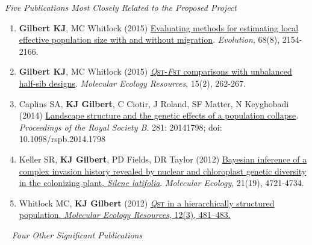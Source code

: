 \emph{Five Publications Most Closely Related to the Proposed Project}
\vspace{4pt}
%
%
\begin{enumerate}[nolistsep]
\item \textbf{Gilbert KJ}, MC Whitlock (2015) \href{http://onlinelibrary.wiley.com/doi/10.1111/evo.12713/abstract}{Evaluating methods for estimating local effective population size with and without migration}. \emph{Evolution}, 68(8), 2154-2166.


\item \textbf{Gilbert KJ}, MC Whitlock (2015) \href{http://onlinelibrary.wiley.com/doi/10.1111/1755-0998.12303/abstract}{\emph{Q}\footnotesize{\textsc{st}}-\normalsize \emph{F}\footnotesize{\textsc{st}} \normalsize comparisons with unbalanced half-sib designs}. \emph{Molecular Ecology Resources}, 15(2), 262-267.

\item Caplins SA, \textbf{KJ Gilbert}, C Ciotir, J Roland, SF Matter, N Keyghobadi (2014) \href{http://m.rspb.royalsocietypublishing.org/content/281/1796/20141798.abstract?cpetoc}{Landscape structure and the genetic effects of a population collapse}. \emph{Proceedings of the Royal Society B}. 281: 20141798; doi: 10.1098/rspb.2014.1798 
   
\item Keller SR, \textbf{KJ Gilbert}, PD Fields, DR Taylor (2012) \href {http://onlinelibrary.wiley.com/doi/10.1111/j.1365-294X.2012.05751.x/abstract}{Bayesian inference of a complex invasion history revealed by nuclear and chloroplast genetic diversity in the colonizing plant, \emph{Silene latifolia}}. \emph{Molecular Ecology}, 21(19), 4721-4734.

\item Whitlock MC, \textbf{KJ Gilbert} (2012) \href {http://onlinelibrary.wiley.com/doi/10.1111/j.1755-0998.2012.03122.x/abstract}{ \emph{Q}\footnotesize{\textsc{st}} \normalsize{in a hierarchically structured population}. \emph{Molecular Ecology Resources}, 12(3), 481--483.} 
    
\end{enumerate}

\vspace{2pt}
\noindent
~ \emph{Four Other Significant Publications}
\vspace{2pt}

